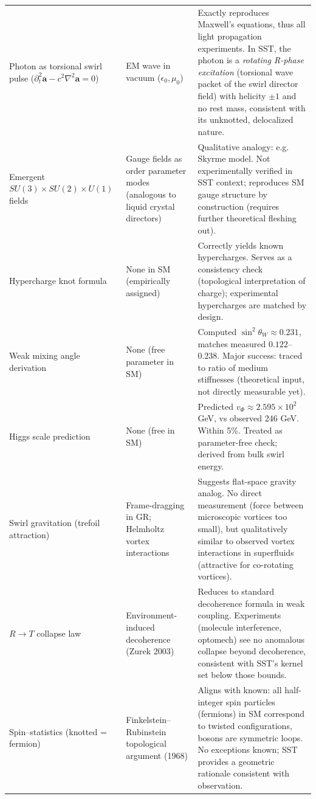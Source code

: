 \documentclass[reprint,aps,onecolumn,nofootinbib]{revtex4-2}
\begin{document}
\begin{table}[hbt!]
\begin{ruledtabular}
\begin{tabular}{|p{3.0cm} p{4.0cm} p{8.0cm}|}
                Photon as torsional swirl pulse
                ($\partial_t^2 \mathbf{a}-c^2\nabla^2\mathbf{a}=0$)
                & EM wave in vacuum ($\epsilon_0,\mu_0$)
                & Exactly reproduces Maxwell’s equations, thus all light propagation experiments. In SST, the photon is a \emph{rotating R-phase excitation} (torsional wave packet of the swirl director field) with helicity $\pm 1$ and no rest mass, consistent with its unknotted, delocalized nature. \\
                Emergent $SU(3)\times SU(2)\times U(1)$ fields & Gauge fields as order parameter modes (analogous to liquid crystal directors) & Qualitative analogy: e.g. Skyrme model. Not experimentally verified in SST context; reproduces SM gauge structure by construction (requires further theoretical fleshing out). \\
				Hypercharge knot formula & None in SM (empirically assigned) & Correctly yields known hypercharges. Serves as a consistency check (topological interpretation of charge); experimental hypercharges are matched by design. \\
				Weak mixing angle derivation & None (free parameter in SM) & Computed $\sin^2\theta_W \approx0.231$, matches measured $0.122$–$0.238$. Major success: traced to ratio of medium stiffnesses (theoretical input, not directly measurable yet). \\
				Higgs scale prediction & None (free in SM) & Predicted $v_{\Phi}\approx2.595\times10^2$ GeV, vs observed 246 GeV. Within 5\%. Treated as parameter-free check; derived from bulk swirl energy. \\
				Swirl gravitation (trefoil attraction) & Frame-dragging in GR; Helmholtz vortex interactions & Suggests flat-space gravity analog. No direct measurement (force between microscopic vortices too small), but qualitatively similar to observed vortex interactions in superfluids (attractive for co-rotating vortices). \\
				$R\to T$ collapse law & Environment-induced decoherence (Zurek 2003) & Reduces to standard decoherence formula in weak coupling. Experiments (molecule interference, optomech) see no anomalous collapse beyond decoherence, consistent with SST’s kernel set below those bounds. \\
				Spin–statistics (knotted = fermion) & Finkelstein–Rubinstein topological argument (1968) & Aligns with known: all half-integer spin particles (fermions) in SM correspond to twisted configurations, bosons are symmetric loops. No exceptions known; SST provides a geometric rationale consistent with observation. \\

\end{tabular}
\end{ruledtabular}
\end{table}
\end{document}
